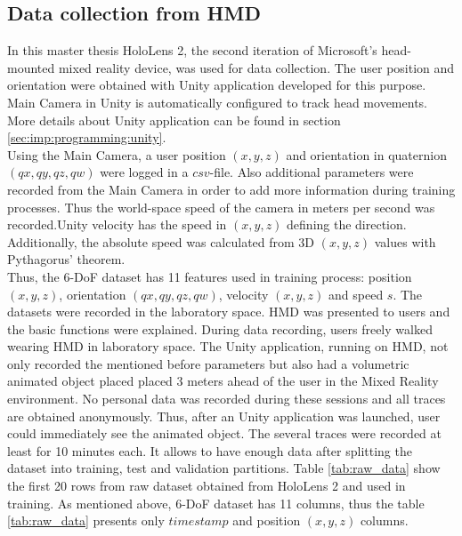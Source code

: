 \subsection{Data collection from HMD}
\label{sec:design:dataset:HL}
In this master thesis HoloLens 2, the second iteration of Microsoft's head-mounted mixed reality device, was used for data collection. The user position and orientation were obtained with Unity application developed for this purpose. Main Camera in Unity is automatically configured to track head movements. More details about Unity application can be found in section \ref{sec:imp:programming:unity}.\\
Using the Main Camera, a user position $(x, y, z)$ and orientation in quaternion $(qx, qy, qz, qw)$ were logged in a $csv$-file. Also additional parameters were recorded from the Main Camera in order to add more information during training processes. Thus the world-space speed of the camera in meters per second was recorded.Unity velocity has the speed in $(x, y, z)$ defining the direction. Additionally, the absolute speed was calculated from 3D $(x, y, z)$ values with Pythagorus' theorem.\\
Thus, the 6-DoF dataset has 11 features used in training process: position $(x, y, z)$, orientation  $(qx, qy, qz, qw)$, velocity $(x, y, z)$ and speed $s$.
The datasets were recorded in the laboratory space. HMD was presented to users and the basic functions were explained. During data recording, users freely walked wearing HMD in laboratory space. The Unity application, running on HMD, not only recorded the mentioned before parameters but also had a volumetric animated object placed placed 3 meters ahead of the user in the Mixed Reality environment. No personal data was recorded during these sessions and all traces are obtained anonymously. Thus, after an Unity application was launched, user could immediately see the animated object. The several traces were recorded at least for 10 minutes each. It allows to have enough data after splitting the dataset into training, test and validation partitions. Table \ref{tab:raw_data} show the first 20 rows from raw dataset obtained from HoloLens 2 and used in training. As mentioned above, 6-DoF dataset has 11 columns, thus the table \ref{tab:raw_data} presents only $timestamp$ and position $(x, y, z)$ columns. 

